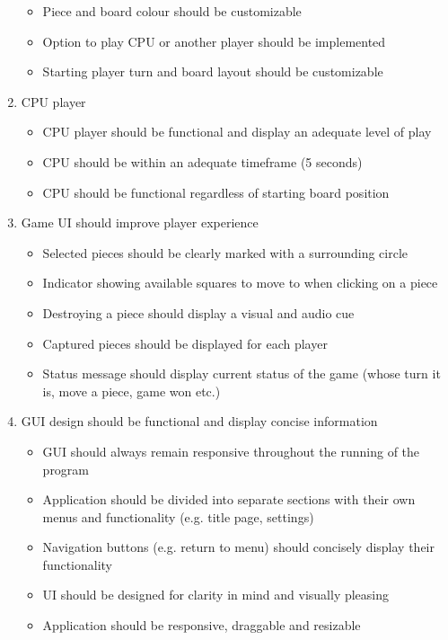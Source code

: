 \documentclass[../main/main.tex]{subfiles}
\begin{document}
\begin{enumerate}
    \begin{itemize}
    \item Piece and board colour should be customizable
    \item Option to play CPU or another player should be implemented
    \item Starting player turn and board layout should be customizable
    \end{itemize}
\item CPU player
    \begin{itemize}
    \item CPU player should be functional and display an adequate level of play
    \item CPU should be within an adequate timeframe (5 seconds)
    \item CPU should be functional regardless of starting board position
    \end{itemize}
\item Game UI should improve player experience
    \begin{itemize}
    \item Selected pieces should be clearly marked with a surrounding circle
    \item Indicator showing available squares to move to when clicking on a piece
    \item Destroying a piece should display a visual and audio cue
    \item Captured pieces should be displayed for each player
    \item Status message should display current status of the game (whose turn it is, move a piece, game won etc.)
    \end{itemize}
\item GUI design should be functional and display concise information
    \begin{itemize}
    \item GUI should always remain responsive throughout the running of the program
    \item Application should be divided into separate sections with their own menus and functionality (e.g. title page, settings)
    \item Navigation buttons (e.g. return to menu) should concisely display their functionality
    \item UI should be designed for clarity in mind and visually pleasing
    \item Application should be responsive, draggable and resizable
    \end{itemize}
\end{enumerate}
\end{document}
